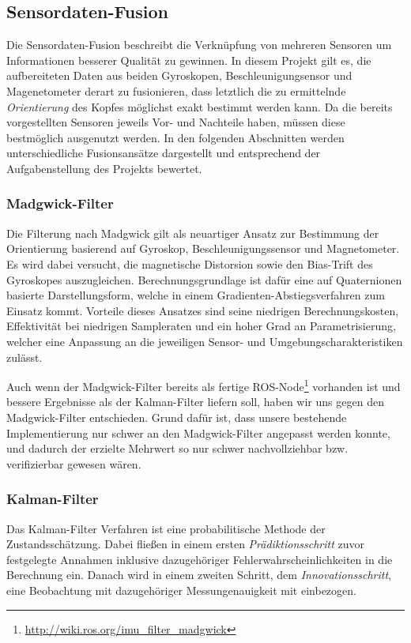 \subsection{Sensordaten-Fusion}
\label{headtracking_fusion_subsec}
Die Sensordaten-Fusion beschreibt die Verknüpfung von mehreren Sensoren um Informationen besserer Qualität zu gewinnen.
In diesem Projekt gilt es, die aufbereiteten Daten aus beiden Gyroskopen, Beschleunigungsensor und Magenetometer derart zu fusionieren, dass letztlich die zu ermittelnde \emph{Orientierung} des Kopfes möglichst exakt bestimmt werden kann.
Da die bereits vorgestellten Sensoren jeweils Vor- und Nachteile haben, müssen diese bestmöglich ausgenutzt werden.
In den folgenden Abschnitten werden unterschiedliche Fusionsansätze dargestellt und entsprechend der Aufgabenstellung des Projekts bewertet. 

\subsubsection{Madgwick-Filter}
Die Filterung nach Madgwick \cite{madgwick2010efficient} gilt als neuartiger Ansatz zur Bestimmung der Orientierung basierend auf Gyroskop, Beschleunigungssensor und Magnetometer.
Es wird dabei versucht, die magnetische Distorsion sowie den Bias-Trift des Gyroskopes auszugleichen.
Berechnungsgrundlage ist dafür eine auf Quaternionen basierte Darstellungsform, welche in einem Gradienten-Abstiegsverfahren zum Einsatz kommt.
Vorteile dieses Ansatzes sind seine niedrigen Berechnungskosten, Effektivität bei niedrigen Sampleraten und ein hoher Grad an Parametrisierung, welcher eine Anpassung an die jeweiligen Sensor- und Umgebungscharakteristiken zulässt.

Auch wenn der Madgwick-Filter bereits als fertige ROS-Node\footnote{\url{http://wiki.ros.org/imu_filter_madgwick}} vorhanden ist und bessere Ergebnisse als der Kalman-Filter liefern soll, haben wir uns gegen den Madgwick-Filter entschieden.
Grund dafür ist, dass unsere bestehende Implementierung nur schwer an den Madgwick-Filter angepasst werden konnte, und dadurch der erzielte Mehrwert so nur schwer nachvollziehbar bzw. verifizierbar gewesen wären. 

\subsubsection{Kalman-Filter}
Das Kalman-Filter Verfahren \cite{kalman1960new} ist eine probabilitische Methode der Zustandsschätzung.
Dabei fließen in einem ersten \emph{Prädiktionsschritt} zuvor festgelegte Annahmen inklusive dazugehöriger Fehlerwahrscheinlichkeiten in die Berechnung ein.
Danach wird in einem zweiten Schritt, dem \emph{Innovationsschritt}, eine Beobachtung mit dazugehöriger Messungenauigkeit mit einbezogen.

